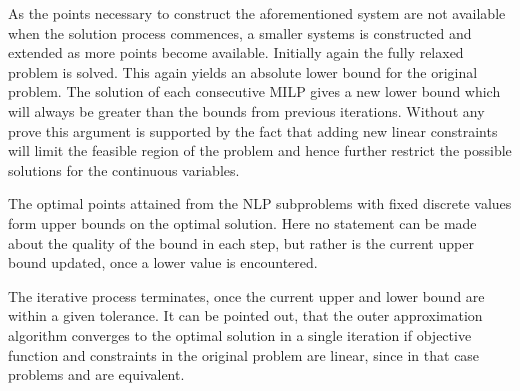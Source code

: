         As the points necessary to construct the aforementioned system are not available when the solution process
        commences, a smaller systems is constructed and extended as more points become available. Initially again
        the fully relaxed problem is solved. This again yields an absolute lower bound for the original problem. The solution of each consecutive
        MILP gives a new lower bound which will always be greater than the bounds from previous iterations. Without any
        prove this argument is supported by the fact that adding new linear constraints will limit the feasible region of
        the problem and hence further restrict the possible solutions for the continuous variables.

        The optimal points attained from the NLP subproblems with fixed discrete values form upper bounds on the optimal
        solution. Here no statement can be made about the quality of the bound in each step, but rather is the current
        upper bound updated, once a lower value is encountered.

        The iterative process terminates, once the current upper and lower bound are within a given tolerance. It can be
        pointed out, that the outer approximation algorithm converges to the optimal solution in a single iteration if
        objective function and constraints in the original problem are linear, since in that case problems
         and  are equivalent.



